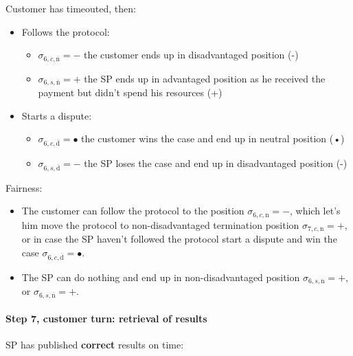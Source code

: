 \documentclass{ieeeaccess}
\begin{document}
Customer has timeouted, then:

\begin{itemize}
\item
  Follows the protocol:

  \begin{itemize}
  
  \item
    \(\sigma_{6, c, \overline{\mathrm{n}}} = -\) the customer ends up in
    disadvantaged position (-)
  \item
    \(\sigma_{6, s, \overline{\mathrm{n}}} = +\) the SP ends up in
    advantaged position as he received the payment but didn't spend his
    resources (+)
  \end{itemize}
\item
  Starts a dispute:

  \begin{itemize}
  
  \item
    \(\sigma_{6, c, \overline{\mathrm{d}}} = •\) the customer wins the
    case and end up in neutral position (•)
  \item
    \(\sigma_{6, s, \overline{\mathrm{d}}} = -\) the SP loses the case
    and end up in disadvantaged position (-)
  \end{itemize}
\end{itemize}

Fairness:

\begin{itemize}

\item
  The customer can follow the protocol to the position
  \(\sigma_{6, c, \mathrm{n}} = -\), which let's him move the protocol
  to non-disadvantaged termination position
  \(\sigma_{7, c, \mathrm{n}} = +\), or in case the SP haven't followed
  the protocol start a dispute and win the case
  \(\sigma_{6, c, \overline{\mathrm{d}}} = •\).
\item
  The SP can do nothing and end up in non-disadvantaged position
  \(\sigma_{6, s, \mathrm{n}} = +\), or
  \(\sigma_{6, s, \overline{\mathrm{n}}} = +\).
\end{itemize}

\paragraph{Step 7, customer turn: retrieval of
results}\label{step-7-retrieval-of-results}

SP has published \textbf{correct} results on time:
\end{document}
